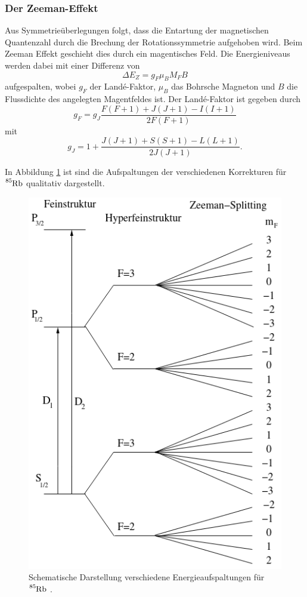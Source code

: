 \subsubsection{Der Zeeman-Effekt}
Aus Symmetrieüberlegungen folgt, dass die Entartung der magnetischen 
Quantenzahl durch die Brechung der Rotationssymmetrie aufgehoben wird.
Beim Zeeman Effekt geschieht dies durch ein magentisches Feld. 
Die Energieniveaus werden dabei mit einer Differenz von 
\begin{equation}
    \Delta E_Z=g_F\mu_B M_F B
\end{equation}
aufgespalten, wobei $g_F$ der Landé-Faktor, $\mu_B$ das Bohrsche Magneton
und $B$ die Flussdichte des angelegten Magentfeldes ist. Der Landé-Faktor
ist gegeben durch 
\begin{equation*}
    g_F=g_J\frac{F(F+1)+J(J+1)-I(I+1)}{2F(F+1)}
\end{equation*}
mit 
\begin{equation*}
    g_J=1+\frac{J(J+1)+S(S+1)-L(L+1)}{2J(J+1)}.
\end{equation*}

\noindent
In Abbildung \ref{fig:niveaus} ist sind die Aufspaltungen der verschiedenen
Korrekturen für $\ce{^{85}Rb}$ qualitativ dargestellt.
\begin{figure}[H]
    \centering
    \includegraphics[scale= 0.4]{pictures/Niveaus.png}
    \caption{Schematische Darstellung verschiedene Energieaufspaltungen für $\ce{^{85}Rb}$ \cite{OptischesPumpen}.}
    \label{fig:niveaus}
\end{figure}

